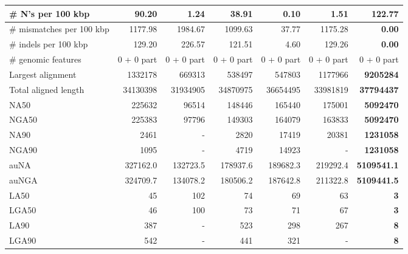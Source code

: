 \documentclass[12pt,a4paper]{article}
\begin{document}
\begin{table}[ht]
\begin{center}
\begin{tabular}{|l*{6}{|r}|}
\# N's per 100 kbp & 90.20 & 1.24 & 38.91 & {\bf 0.10} & 1.51 & 122.77 \\ \hline
\# mismatches per 100 kbp & 1177.98 & 1984.67 & 1099.63 & 37.77 & 1175.28 & {\bf 0.00} \\ \hline
\# indels per 100 kbp & 129.20 & 226.57 & 121.51 & 4.60 & 129.26 & {\bf 0.00} \\ \hline
\# genomic features & 0 + 0 part & 0 + 0 part & 0 + 0 part & 0 + 0 part & 0 + 0 part & 0 + 0 part \\ \hline
Largest alignment & 1332178 & 669313 & 538497 & 547803 & 1177966 & {\bf 9205284} \\ \hline
Total aligned length & 34130398 & 31934905 & 34870975 & 36654495 & 33981819 & {\bf 37794437} \\ \hline
NA50 & 225632 & 96514 & 148446 & 165440 & 175001 & {\bf 5092470} \\ \hline
NGA50 & 225383 & 97796 & 149303 & 164079 & 163833 & {\bf 5092470} \\ \hline
NA90 & 2461 & - & 2820 & 17419 & 20381 & {\bf 1231058} \\ \hline
NGA90 & 1095 & - & 4719 & 14923 & - & {\bf 1231058} \\ \hline
auNA & 327162.0 & 132723.5 & 178937.6 & 189682.3 & 219292.4 & {\bf 5109541.1} \\ \hline
auNGA & 324709.7 & 134078.2 & 180506.2 & 187642.8 & 211322.8 & {\bf 5109441.5} \\ \hline
LA50 & 45 & 102 & 74 & 69 & 63 & {\bf 3} \\ \hline
LGA50 & 46 & 100 & 73 & 71 & 67 & {\bf 3} \\ \hline
LA90 & 387 & - & 523 & 298 & 267 & {\bf 8} \\ \hline
LGA90 & 542 & - & 441 & 321 & - & {\bf 8} \\ \hline
\end{tabular}
\end{center}
\end{table}
\end{document}

